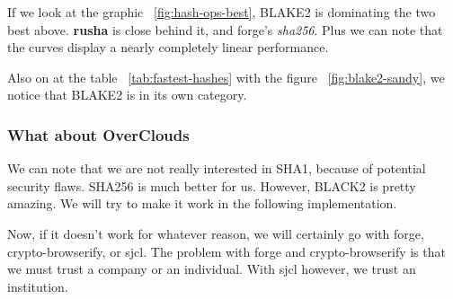 If we look at the graphic ~\ref{fig:hash-ops-best}, BLAKE2 is dominating the two best above. \textbf{rusha} is close behind it, and forge's \textit{sha256}. Plus we can note that the curves display a nearly completely linear performance.

Also on at the table ~\ref{tab:fastest-hashes} with the figure ~\ref{fig:blake2-sandy}, we notice that BLAKE2 is in its own category. 

\subsubsection{What about OverClouds}
We can note that we are not really interested in SHA1, because of potential security flaws. SHA256 is much better for us. However, BLACK2 is pretty amazing. We will try to make it work in the following implementation.

Now, if it doesn't work for whatever reason, we will certainly go with forge, crypto-browserify, or sjcl. The problem with forge and crypto-browserify is that we must trust a company or an individual. With sjcl however, we trust an institution.

